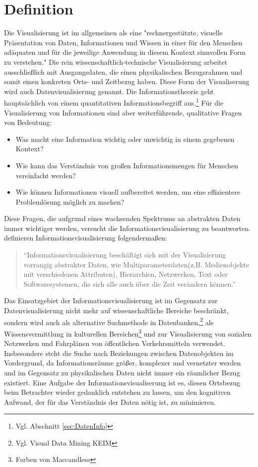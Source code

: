\documentclass[a4paper, 12pt, DIVcalc, onepage, pdftex, headsepline, footsepline]{scrreprt}
\begin{document}
\section{Definition}
\label{sec:Definition}
Die Visualisierung ist im allgemeinen als eine "rechnergestützte, visuelle Präsentation von Daten, Informationen und Wissen
in einer für den Menschen adäquaten und für die jeweilige Anwendung in diesem Kontext sinnvollen Form
zu verstehen."\citep[S.\,3]{Schumann}
Die rein wissenschaftlich-technische Visualisierung arbeitet ausschließlich mit Ausgangsdaten,
die einen physikalischen Bezugsrahmen und somit einen konkreten Orts- und Zeitbezug haben. Diese Form der
Visualiserung wird auch Datenvisualisierung genannt.
Die Informationstheorie geht hauptsächlich von einem quantitativen Informationsbegriff aus.\footnote{Vgl. 
Abschnitt \ref{sec:DatenInfo}} Für die Visualisierung von Informationen sind aber
weiterführende, qualitative Fragen von Bedeutung:
\begin{itemize}
\item Was macht eine Information wichtig oder unwichtig in einem gegebenen Kontext?
\item Wie kann das Verständnis von großen Informationsmengen für Menschen vereinfacht werden?
\item Wie können Informationen visuell aufbereitet werden, um eine effizientere Problemlösung möglich zu machen?
\end{itemize}
Diese Fragen, die aufgrund eines wachsenden Spektrums an abstrakten Daten immer wichtiger werden,
versucht die Informationsvisualisierung zu beantworten.
\citep[S.\,434]{Preim} definieren Informationsvisualisierung folgendermaßen:
\begin{quote}
"`Informationsvisualisierung beschäftigt sich mit der Visualisierung vorrangig abstrakter Daten, wie
Multiparameterdaten(z.B. Medienobjekte mit verschiedenen Attributen), Hierarchien, Netzwerken, Text
oder Softwaresystemen, die sich alle auch über die Zeit verändern können."'
\end{quote}
Das Einsatzgebiet der Informationsvisualisierung ist im Gegensatz zur Datenvisualisierung nicht mehr
auf wissenschaftliche Bereiche beschränkt,
sondern wird auch als alternative Suchmethode in Datenbanken,\footnote{Vgl. Visual Data Mining KEIM}
als Wissensvermittlung in kulturellen Bereichen\footnote{Farben von Maccandless} und zur Visualisierung von
sozialen Netzwerken und Fahrplänen von öffentlichen Verkehrsmitteln verwendet.
Insbesondere steht die Suche nach Beziehungen zwischen Datenobjekten im Vordergrund,
da Informationsräume größer, komplexer und vernetzter werden und im Gegensatz
zu physikalischen Daten nicht immer ein räumlicher Bezug existiert.
Eine Aufgabe der Informationsvisualiserung ist es, diesen Ortsbezug beim Betrachter wieder gedanklich
entstehen zu lassen, um den kognitiven Aufwand, der für das Verständnis der Daten nötig ist, zu minimieren.
\end{document}
